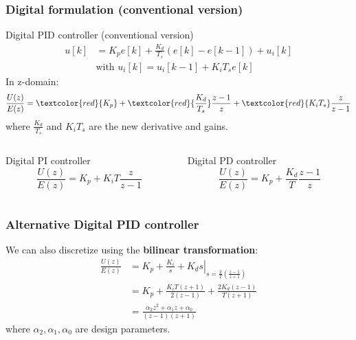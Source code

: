 \begin{frame}
	\frametitle{Digital formulation (conventional version)}
	\vspace{-1em}
	\small{
	\begin{block}{Digital PID controller (conventional version)}
			\vspace{-1em}
			\begin{align*}
			u[k] &= K_p e[k] + \frac{K_d}{T_s}(e[k] - e[k-1])+u_i[k] \\
			&\text{with } u_i[k] = u_i[k-1] + K_i T_s e[k]
			\end{align*}	
			In z-domain:
			\begin{equation*}
			\frac{U(z)}{E(z)} = \textcolor{red}{K_p}  + \textcolor{red}{\frac{K_d}{T_s}}\frac{z-1}{z} + \textcolor{red}{K_i T_s}\frac{z}{z-1}
			\end{equation*}
			where $\frac{K_d}{T_s}$ and $K_iT_s$  are the new derivative and gains.
	\end{block}
	\begin{columns}
		\begin{column}{0.5 \textwidth}
			\begin{block}{Digital PI controller}
				$$\frac{U(z)}{E(z)} = K_p + K_i T \frac{z}{z-1} $$
			\end{block}
		\end{column}
		\begin{column}{0.5 \textwidth}
			\begin{block}{Digital PD controller}
				$$\frac{U(z)}{E(z)} = K_p + \frac{K_d}{T}\frac{z-1}{z} $$
			\end{block}
		\end{column}
	\end{columns}}
\end{frame}

\begin{frame}
	\frametitle{Alternative Digital PID controller}
	We can also discretize using the \textbf{bilinear transformation}:
	\begin{align*}
		\frac{U(z)}{E(z)} &=  
				\left. K_p + \frac{K_i}{s} + K_d s \right|_
							{s=\frac{2}{T}\left( \frac{z-1}{z+1}\right)}  \\
			&= K_p + \frac{K_iT(z + 1)}{2(z-1)} + \frac{2K_d(z-1)}{T(z+1)} \\
			&= \frac{\alpha_2 z^2 + \alpha_1 z + \alpha_0}{(z-1)(z+1)}
	\end{align*}
	where $\alpha_2, \alpha_1, \alpha_0$ are design parameters.
\end{frame}

